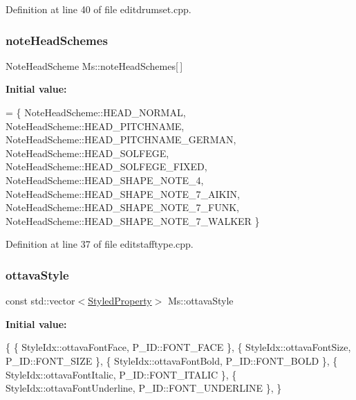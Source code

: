 Definition at line 40 of file editdrumset.\+cpp.

\mbox{\label{namespace_ms_acc17a43fdff7484e49948de632c039ac}} 
\subsubsection{\texorpdfstring{note\+Head\+Schemes}{noteHeadSchemes}}
{\footnotesize\ttfamily Note\+Head\+Scheme Ms\+::note\+Head\+Schemes\mbox{[}$\,$\mbox{]}}

{\bfseries Initial value\+:}
\begin{DoxyCode}
= \{
      NoteHeadScheme::HEAD\_NORMAL,
      NoteHeadScheme::HEAD\_PITCHNAME,
      NoteHeadScheme::HEAD\_PITCHNAME\_GERMAN,
      NoteHeadScheme::HEAD\_SOLFEGE,
      NoteHeadScheme::HEAD\_SOLFEGE\_FIXED,
      NoteHeadScheme::HEAD\_SHAPE\_NOTE\_4,
      NoteHeadScheme::HEAD\_SHAPE\_NOTE\_7\_AIKIN,
      NoteHeadScheme::HEAD\_SHAPE\_NOTE\_7\_FUNK,
      NoteHeadScheme::HEAD\_SHAPE\_NOTE\_7\_WALKER
      \}
\end{DoxyCode}


Definition at line 37 of file editstafftype.\+cpp.

\mbox{\label{namespace_ms_a4d0034afa42590b9853b16d1c9662097}} 
\subsubsection{\texorpdfstring{ottava\+Style}{ottavaStyle}}
{\footnotesize\ttfamily const std\+::vector$<$\hyperlink{struct_ms_1_1_styled_property}{Styled\+Property}$>$ Ms\+::ottava\+Style}

{\bfseries Initial value\+:}
\begin{DoxyCode}
\{
      \{ StyleIdx::ottavaFontFace,                     P\_ID::FONT\_FACE              \},
      \{ StyleIdx::ottavaFontSize,                     P\_ID::FONT\_SIZE              \},
      \{ StyleIdx::ottavaFontBold,                     P\_ID::FONT\_BOLD              \},
      \{ StyleIdx::ottavaFontItalic,                   P\_ID::FONT\_ITALIC            \},
      \{ StyleIdx::ottavaFontUnderline,                P\_ID::FONT\_UNDERLINE         \},
      \}
\end{DoxyCode}


